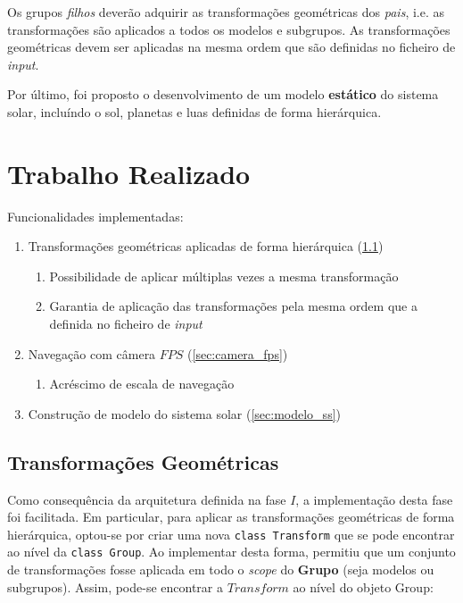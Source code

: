 \documentclass[runningheads]{llncs}
\begin{document}
Os grupos \textit{filhos} deverão adquirir as transformações geométricas dos \textit{pais},
i.e. as transformações são aplicados a todos os modelos e subgrupos.
As transformações geométricas devem ser aplicadas na mesma ordem que são definidas no ficheiro de \textit{input}.

Por último, foi proposto o desenvolvimento de um modelo \textbf{estático} do sistema solar, incluíndo o sol,
planetas e luas definidas de forma hierárquica.

\section{Trabalho Realizado}
Funcionalidades implementadas:
\begin{enumerate}
    \item Transformações geométricas aplicadas de forma hierárquica (\ref{sec:transf_geometricas})
          \begin{enumerate}
              \item Possibilidade de aplicar múltiplas vezes a mesma transformação
              \item Garantia de aplicação das transformações pela mesma ordem que a definida no ficheiro de \textit{input}
          \end{enumerate}
    \item Navegação com câmera $FPS$ (\ref{sec:camera_fps})
          \begin{enumerate}
              \item Acréscimo de escala de navegação
          \end{enumerate}
    \item Construção de modelo do sistema solar (\ref{sec:modelo_ss})
\end{enumerate}

\subsection{Transformações Geométricas} \label{sec:transf_geometricas}
Como consequência da arquitetura definida na fase $I$, a implementação desta fase foi facilitada.
Em particular, para aplicar as transformações geométricas de forma hierárquica, optou-se
por criar uma nova \texttt{class Transform} que se pode encontrar ao nível da
\texttt{class Group}.
Ao implementar desta forma, permitiu que um conjunto de transformações fosse aplicada em todo
o \textit{scope} do \textbf{Grupo} (seja modelos ou subgrupos).
Assim, pode-se encontrar a $Transform$ ao nível do objeto Group:
\end{document}
